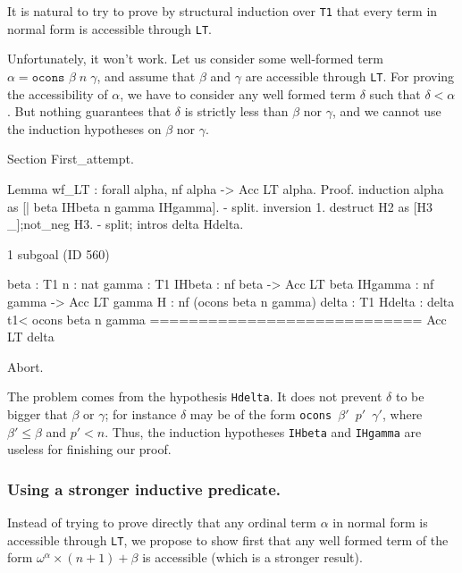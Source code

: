 It is natural to try to prove by structural induction over \texttt{T1} 
that every term in normal form is accessible through \texttt{LT}.

Unfortunately, it won't work. Let us consider some well-formed term
 $\alpha=\texttt{ocons $\beta\;n\;\gamma$}$, and assume that \(\beta\) and \(\gamma\) are accessible
 through \texttt{LT}. For proving the accessibility of $\alpha$, we have to consider
any well formed term \(\delta\) such that \(\delta<\alpha\). 
But nothing guarantees that \(\delta\)  is strictly  less than \(\beta\) nor \(\gamma\), and we cannot use the induction hypotheses on   \(\beta\) nor \(\gamma\).

\begin{Coqbad}
Section First_attempt.

 Lemma wf_LT : forall alpha,  nf alpha -> Acc LT alpha. 
 Proof.
  induction alpha as [| beta IHbeta n gamma IHgamma].
  - split.
    inversion 1.
    destruct H2 as [H3 _];not_neg H3.
  -  split; intros delta Hdelta.
\end{Coqbad}

\begin{Coqanswer}
1 subgoal (ID 560)
  
  beta : T1
  n : nat
  gamma : T1
  IHbeta : nf beta -> Acc LT beta
  IHgamma : nf gamma -> Acc LT gamma
  H : nf (ocons beta n gamma)
  delta : T1
  Hdelta : delta t1< ocons beta n gamma
  ============================
  Acc LT delta
 \end{Coqanswer}

\begin{Coqbad}
  Abort.
\end{Coqbad}

The problem comes from the hypothesis \texttt{Hdelta}. It does not prevent  \(\delta\) to be bigger that \(\beta\) or
\(\gamma\);
for instance \(\delta\) may be of the form
\texttt{ocons $\beta'$ $p'$  $\gamma'$},
where  \(\beta' \leq  \beta\) and  \(p' < n\).
Thus, the induction hypotheses \texttt{IHbeta} and \texttt{IHgamma}  are useless for finishing our proof.

\subsubsection{Using a stronger inductive predicate.}
\label{sec:orgheadline78}
  Instead of trying to prove directly that any ordinal term \(\alpha\) in normal form is accessible
through \texttt{LT}, we propose to show first that any well formed 
term of the form \(\omega^\alpha\times(n+1)+\beta\) is accessible (which is a stronger result).

